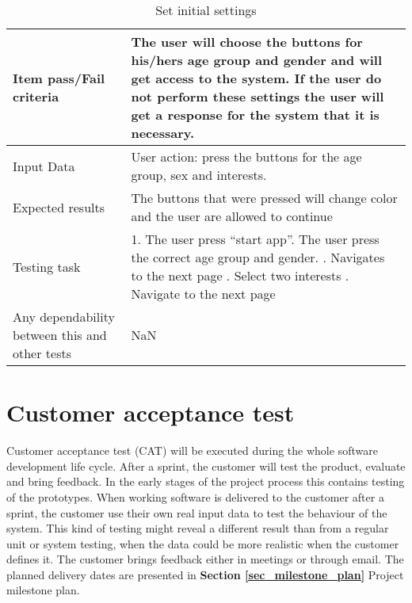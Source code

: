 {{\begin{table}[!h]
\begin{center}
\begin{tabular}{| p{5cm} | p{12cm} |}
			Item pass/Fail criteria & The user will choose the buttons for his/hers age group and gender and will get access to the system. If the user do not perform these settings the user will get a response for the system that it is necessary.  \\ \hline
			
			Input Data & User action: press the buttons for the age group, sex and interests.   \\ \hline
			
			Expected results & The buttons that were pressed will change color and the user are allowed to continue   \\ \hline
			
			Testing task & 1. The user press “start app”\newline 2. The user press the correct age group and gender. \newline
			3. Navigates to the next page \newline 4. Select two interests \newline 5. Navigate to the next page  \\ \hline
			
			Any dependability between this and other tests & NaN \\ \hline
		\end{tabular}
	\end{center}
	\caption{Set initial settings}
	\label{Tab_systemtest2}
\end{table}

\section{Customer acceptance test}
\label{sec_acceptance_test}

Customer acceptance test (CAT) will be executed during the whole software development life cycle. After a sprint, the customer will test the product, evaluate and bring feedback. In the early stages of the project process this contains testing of the prototypes. When working software is delivered to the customer after a sprint, the customer use their own real input data to test the behaviour of the system. This kind of testing might reveal a different result than from a regular unit or system testing, when the data could be more realistic when the customer defines it. The customer brings feedback either in meetings or through email. The planned delivery dates are presented in \textbf{Section \ref{sec_milestone_plan}} Project milestone plan.  

}}
